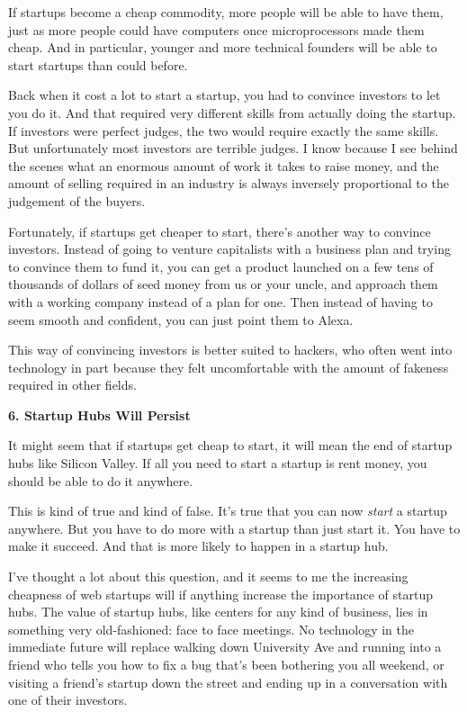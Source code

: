 If startups become a cheap commodity, more people will be able to have
them, just as more people could have computers once microprocessors made
them cheap. And in particular, younger and more technical founders will
be able to start startups than could before.

Back when it cost a lot to start a startup, you had to convince
investors to let you do it. And that required very different skills from
actually doing the startup. If investors were perfect judges, the two
would require exactly the same skills. But unfortunately most investors
are terrible judges. I know because I see behind the scenes what an
enormous amount of work it takes to raise money, and the amount of
selling required in an industry is always inversely proportional to the
judgement of the buyers.

Fortunately, if startups get cheaper to start, there's another way to
convince investors. Instead of going to venture capitalists with a
business plan and trying to convince them to fund it, you can get a
product launched on a few tens of thousands of dollars of seed money
from us or your uncle, and approach them with a working company instead
of a plan for one. Then instead of having to seem smooth and confident,
you can just point them to Alexa.

This way of convincing investors is better suited to hackers, who often
went into technology in part because they felt uncomfortable with the
amount of fakeness required in other fields.

\textbf{6. Startup Hubs Will Persist}

It might seem that if startups get cheap to start, it will mean the end
of startup hubs like Silicon Valley. If all you need to start a startup
is rent money, you should be able to do it anywhere.

This is kind of true and kind of false. It's true that you can now
\emph{start} a startup anywhere. But you have to do more with a startup
than just start it. You have to make it succeed. And that is more likely
to happen in a startup hub.

I've thought a lot about this question, and it seems to me the
increasing cheapness of web startups will if anything increase the
importance of startup hubs. The value of startup hubs, like centers for
any kind of business, lies in something very old-fashioned: face to face
meetings. No technology in the immediate future will replace walking
down University Ave and running into a friend who tells you how to fix a
bug that's been bothering you all weekend, or visiting a friend's
startup down the street and ending up in a conversation with one of
their investors.

